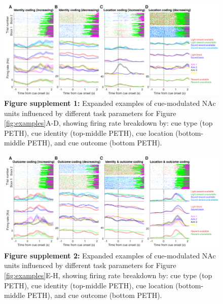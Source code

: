 \documentclass[11pt]{article}
\newcommand{\bsf}[1]{\textbf{#1}}
\begin{document}
 \begin{figure}[ht!]
\centering
\includegraphics[width=\textwidth]{Fig 4 - Neural examples SUPP1.pdf}
\caption*{\bsf{Figure supplement 1:} Expanded examples of cue-modulated NAc units influenced by different
  task parameters for Figure \ref{fig:examples}A-D, showing firing rate breakdown by: cue type (top PETH), cue identity (top-middle PETH), cue location (bottom-middle PETH), and cue outcome (bottom PETH).}
\label{fig:examplesSUPP1}
\end{figure} \clearpage

 \begin{figure}[ht!]
\centering
\includegraphics[width=\textwidth]{Fig 4 - Neural examples SUPP2.pdf}
\caption*{\bsf{Figure supplement 2:} Expanded examples of cue-modulated NAc units influenced by different
  task parameters for Figure \ref{fig:examples}E-H, showing firing rate breakdown by: cue type (top PETH), cue identity (top-middle PETH), cue location (bottom-middle PETH), and cue outcome (bottom PETH).}
\label{fig:examplesSUPP2}
\end{figure} \clearpage
\end{document}
